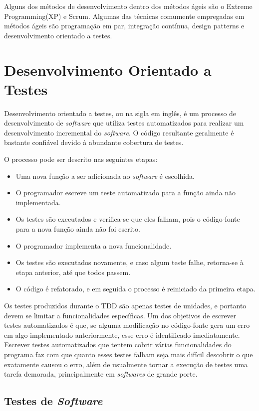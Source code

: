 Alguns dos métodos de desenvolvimento dentro dos métodos ágeis são o Extreme Programming(XP) e Scrum. Algumas das técnicas comumente empregadas em métodos ágeis são programação em par, integração contínua, design patterns e desenvolvimento orientado a testes.

\section{Desenvolvimento Orientado a Testes}\label{fun:tdd}

Desenvolvimento orientado a testes, ou  na sigla em inglês, é um processo de desenvolvimento de \emph{software} que utiliza testes automatizados para realizar um desenvolvimento incremental do \emph{software}. O código resultante geralmente é bastante confiável devido à abundante cobertura de testes.

O processo pode ser descrito nas seguintes etapas:
\begin{itemize}
\item Uma nova função a ser adicionada ao \emph{software} é escolhida.
\item O programador escreve um teste automatizado para a função ainda não implementada.
\item Os testes são executados e verifica-se que eles falham, pois o código-fonte para a nova função ainda não foi escrito.
\item O programador implementa a nova funcionalidade.
\item Os testes são executados novamente, e caso algum teste falhe, retorna-se à etapa anterior, até que todos passem.
\item O código é refatorado, e em seguida o processo é reiniciado da primeira etapa.
\end{itemize}

Os testes produzidos durante o TDD são apenas testes de unidades, e portanto devem se limitar a funcionalidades específicas. Um dos objetivos de escrever testes automatizados é que, se alguma modificação no código-fonte gera um erro em algo implementado anteriormente, esse erro é identificado imediatamente. Escrever testes automatizados que tentem cobrir várias funcionalidades do programa faz com que quanto esses testes falham seja mais difícil descobrir o que exatamente causou o erro, além de usualmente tornar a execução de testes uma tarefa demorada, principalmente em \emph{softwares} de grande porte.

\subsection{Testes de \emph{Software}}

